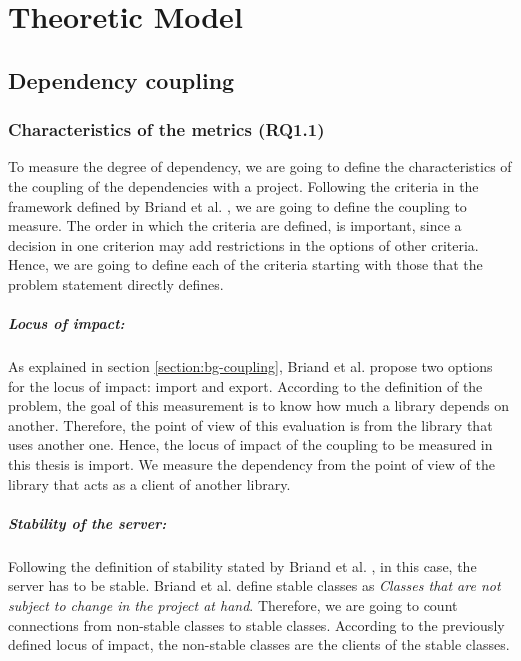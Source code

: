 \chapter{Theoretic Model}\label{ch:TheoreticModel}

\section{Dependency coupling}

\subsection{Characteristics of the metrics (RQ1.1)}
To measure the degree of dependency, we are going to define the characteristics of the coupling of the dependencies with a project. Following the criteria in the framework defined by Briand et al. \cite{briand1999unified}, we are going to define the coupling to measure. The order in which the criteria are defined, is important, since a decision in one criterion may add restrictions in the options of other criteria. Hence, we are going to define each of the criteria starting with those that the problem statement directly defines.

\paragraph{Locus of impact:}
As explained in section \ref{section:bg-coupling}, Briand et al. propose two options for the locus of impact: import and export. According to the definition of the problem, the goal of this measurement is to know how much a library depends on another. Therefore, the point of view of this evaluation is from the library that uses another one. Hence, the locus of impact of the coupling to be measured in this thesis is import. We measure the dependency from the point of view of the library that acts as a client of another library.

\paragraph{Stability of the server:}
Following the definition of stability stated by Briand et al. \cite{briand1999unified}, in this case, the server has to be stable. Briand et al. define stable classes as \textit{Classes that are not subject to change in the project at hand}. Therefore, we are going to count connections from non-stable classes to stable classes. According to the previously defined locus of impact, the non-stable classes are the clients of the stable classes.

